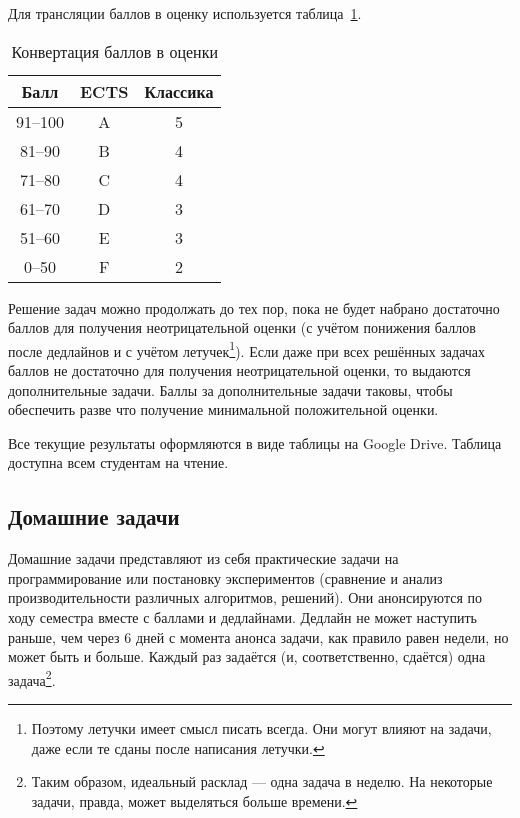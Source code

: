 Для трансляции баллов в оценку используется таблица~\ref{tbl:ects}.

\begin{table}[h]
    \caption{Конвертация баллов в оценки}
    \label{tbl:ects}
\begin{center}
    \begin{tabular}{ | c | c | c |}
        \hline
        Балл & ECTS & Классика \\ 
        \hline
        \hline
        91--100 & A & 5 \\  
        81--90  & B & 4 \\  
        71--80  & C & 4 \\  
        61--70  & D & 3 \\  
        51--60  & E & 3 \\  
         0--50  & F & 2 \\   
        \hline
    \end{tabular}
\end{center}
\end{table}

Решение задач можно продолжать до тех пор, пока не будет набрано достаточно баллов для получения неотрицательной оценки (с учётом понижения баллов после дедлайнов и с учётом летучек\footnote{Поэтому летучки имеет смысл писать всегда. Они могут влияют на задачи, даже если те сданы после написания летучки.}). 
Если даже при всех решённых задачах баллов не достаточно для получения неотрицательной оценки, то выдаются дополнительные задачи. 
Баллы за дополнительные задачи таковы, чтобы обеспечить разве что получение минимальной положительной оценки. 

Все текущие результаты оформляются в виде таблицы на Google Drive.
Таблица доступна всем студентам на чтение.

\subsection{Домашние задачи}

Домашние задачи представляют из себя практические задачи на программирование или постановку экспериментов (сравнение и анализ производительности различных алгоритмов, решений).
Они анонсируются по ходу семестра вместе с баллами и дедлайнами.
Дедлайн не может наступить раньше, чем через 6 дней с момента анонса задачи, как правило равен недели, но может быть и больше. Каждый раз задаётся (и, соответственно, сдаётся) одна задача\footnote{Таким образом, идеальный расклад --- одна задача в неделю. На некоторые задачи, правда, может выделяться больше времени.}. 

